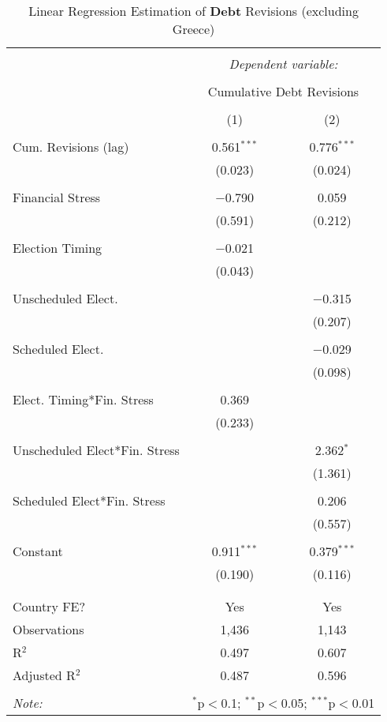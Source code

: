 
\begin{table}[!htbp] \centering 
  \caption{Linear Regression Estimation of \textbf{Debt} Revisions (excluding Greece)} 
  \label{debt_no_greece_results} 
\small 
\begin{tabular}{@{\extracolsep{5pt}}lcc} 
\\[-1.8ex]\hline 
\hline \\[-1.8ex] 
 & \multicolumn{2}{c}{\textit{Dependent variable:}} \\ 
\cline{2-3} 
\\[-1.8ex] & \multicolumn{2}{c}{Cumulative Debt Revisions} \\ 
\\[-1.8ex] & (1) & (2)\\ 
\hline \\[-1.8ex] 
 Cum. Revisions (lag) & 0.561$^{***}$ & 0.776$^{***}$ \\ 
  & (0.023) & (0.024) \\ 
  & & \\ 
 Financial Stress & $-$0.790 & 0.059 \\ 
  & (0.591) & (0.212) \\ 
  & & \\ 
 Election Timing & $-$0.021 &  \\ 
  & (0.043) &  \\ 
  & & \\ 
 Unscheduled Elect. &  & $-$0.315 \\ 
  &  & (0.207) \\ 
  & & \\ 
 Scheduled Elect. &  & $-$0.029 \\ 
  &  & (0.098) \\ 
  & & \\ 
 Elect. Timing*Fin. Stress & 0.369 &  \\ 
  & (0.233) &  \\ 
  & & \\ 
 Unscheduled Elect*Fin. Stress &  & 2.362$^{*}$ \\ 
  &  & (1.361) \\ 
  & & \\ 
 Scheduled Elect*Fin. Stress &  & 0.206 \\ 
  &  & (0.557) \\ 
  & & \\ 
 Constant & 0.911$^{***}$ & 0.379$^{***}$ \\ 
  & (0.190) & (0.116) \\ 
  & & \\ 
\hline \\[-1.8ex] 
Country FE? & Yes & Yes \\ 
Observations & 1,436 & 1,143 \\ 
R$^{2}$ & 0.497 & 0.607 \\ 
Adjusted R$^{2}$ & 0.487 & 0.596 \\ 
\hline 
\hline \\[-1.8ex] 
\textit{Note:}  & \multicolumn{2}{r}{$^{*}$p$<$0.1; $^{**}$p$<$0.05; $^{***}$p$<$0.01} \\ 
\end{tabular} 
\end{table} 

